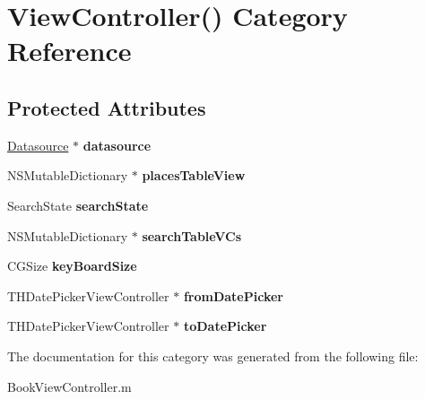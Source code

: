 \hypertarget{category_view_controller_07_08}{}\section{View\+Controller() Category Reference}
\label{category_view_controller_07_08}
\subsection*{Protected Attributes}
\begin{DoxyCompactItemize}
\item 
\hyperlink{interface_datasource}{Datasource} $\ast$ {\bfseries datasource}\hypertarget{category_view_controller_07_08_a6e2a9bc9db8de3c7335d230b1139f257}{}\label{category_view_controller_07_08_a6e2a9bc9db8de3c7335d230b1139f257}

\item 
N\+S\+Mutable\+Dictionary $\ast$ {\bfseries places\+Table\+View}\hypertarget{category_view_controller_07_08_a24cb1915add2f7ab8ff30641a325a1c6}{}\label{category_view_controller_07_08_a24cb1915add2f7ab8ff30641a325a1c6}

\item 
Search\+State {\bfseries search\+State}\hypertarget{category_view_controller_07_08_a757d70305b6069a101dd5c86652244e8}{}\label{category_view_controller_07_08_a757d70305b6069a101dd5c86652244e8}

\item 
N\+S\+Mutable\+Dictionary $\ast$ {\bfseries search\+Table\+V\+Cs}\hypertarget{category_view_controller_07_08_a723eb774536129574725823c0f47c2b6}{}\label{category_view_controller_07_08_a723eb774536129574725823c0f47c2b6}

\item 
C\+G\+Size {\bfseries key\+Board\+Size}\hypertarget{category_view_controller_07_08_a7063aef151dc269b4227632f413d1337}{}\label{category_view_controller_07_08_a7063aef151dc269b4227632f413d1337}

\item 
T\+H\+Date\+Picker\+View\+Controller $\ast$ {\bfseries from\+Date\+Picker}\hypertarget{category_view_controller_07_08_ac3ee96469d0a76a7e8ed47d7af3c9299}{}\label{category_view_controller_07_08_ac3ee96469d0a76a7e8ed47d7af3c9299}

\item 
T\+H\+Date\+Picker\+View\+Controller $\ast$ {\bfseries to\+Date\+Picker}\hypertarget{category_view_controller_07_08_a1448d1326357b450c7b25e04ed0c98f1}{}\label{category_view_controller_07_08_a1448d1326357b450c7b25e04ed0c98f1}

\end{DoxyCompactItemize}


The documentation for this category was generated from the following file\+:\begin{DoxyCompactItemize}
\item 
Book\+View\+Controller.\+m\end{DoxyCompactItemize}
